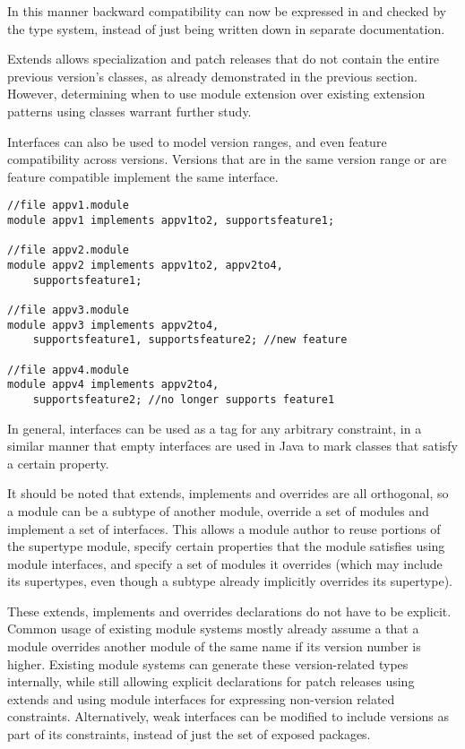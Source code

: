 In this manner backward compatibility can now be expressed in 
and checked by the type system, instead of just being written
down in separate documentation.

Extends allows specialization and patch releases that do not contain 
the entire previous version's classes, as already demonstrated in
the previous section. However, determining when to use module
extension over existing extension patterns using classes warrant
further study.

Interfaces can also be used to model version ranges, and even feature
compatibility across versions. Versions that are in the same version 
range or are feature compatible implement the same interface.

\begin{lstlisting}[caption=Interfaces as Properties]
//file appv1.module
module appv1 implements appv1to2, supportsfeature1;

//file appv2.module
module appv2 implements appv1to2, appv2to4, 
	supportsfeature1;

//file appv3.module
module appv3 implements appv2to4, 
	supportsfeature1, supportsfeature2; //new feature

//file appv4.module
module appv4 implements appv2to4, 
	supportsfeature2; //no longer supports feature1
\end{lstlisting}

In general, interfaces can be used as a tag for any arbitrary constraint, 
in a similar manner that empty interfaces are used in Java to mark classes 
that satisfy a certain property.

It should be noted that extends, implements and overrides are all orthogonal,
so a module can be a subtype of another module, override a set of modules and
implement a set of interfaces. This allows a module author to reuse portions
of the supertype module, specify certain properties that the module satisfies
using module interfaces, and specify a set of modules it overrides (which may
include its supertypes, even though a subtype already implicitly overrides
its supertype).

These extends, implements and overrides declarations do not have to be explicit.
Common usage of existing module systems mostly already assume a that a 
module overrides another module of the same name if its version 
number is higher. Existing module systems can generate these version-related types 
internally, while still allowing explicit declarations for patch releases 
using extends and using module interfaces for expressing non-version
related constraints. Alternatively, weak interfaces can be modified to include
versions as part of its constraints, instead of just the set of exposed packages.

